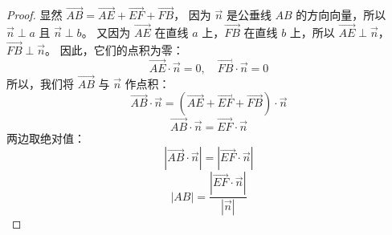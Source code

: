\begin{proof}
    显然 $\overrightarrow{AB} = \overrightarrow{AE} + \overrightarrow{EF} + \overrightarrow{FB}$，
    因为 $\overrightarrow{n}$ 是公垂线 $AB$ 的方向向量，所以 $\overrightarrow{n} \perp a$ 且 $\overrightarrow{n} \perp b$。
    又因为 $\overrightarrow{AE}$ 在直线 $a$ 上，$\overrightarrow{FB}$ 在直线 $b$ 上，所以 $\overrightarrow{AE} \perp \overrightarrow{n}$，$\overrightarrow{FB} \perp \overrightarrow{n}$。
    因此，它们的点积为零：
    \[ \overrightarrow{AE} \cdot \overrightarrow{n} = 0, \quad \overrightarrow{FB} \cdot \overrightarrow{n} = 0 \]
    所以，我们将 $\overrightarrow{AB}$ 与 $\overrightarrow{n}$ 作点积：
    \[
        \overrightarrow{AB} \cdot \overrightarrow{n} = (\overrightarrow{AE} + \overrightarrow{EF} + \overrightarrow{FB}) \cdot \overrightarrow{n}
    \]
    \[
        \overrightarrow{AB} \cdot \overrightarrow{n} = \overrightarrow{EF} \cdot \overrightarrow{n}
    \]
    两边取绝对值：
    \[
        |\overrightarrow{AB} \cdot \overrightarrow{n}| = |\overrightarrow{EF} \cdot \overrightarrow{n}|
    \]
    \[
        |AB| = \frac{|\overrightarrow{EF} \cdot \overrightarrow{n}|}{|\overrightarrow{n}|}
    \]
\end{proof}
